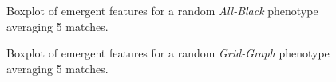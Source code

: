 \vspace*{\fill}
{
\centering
\begin{figure}[hbt!]
    \centering
    \caption{Boxplot of emergent features for a random \textit{All-Black} phenotype averaging 5 matches.}
    \label{fig:emergent_features_noisiness_5_ab}
\end{figure}
}
\vspace*{\fill}
\begin{figure}[p]
    \caption{Boxplot of emergent features for a random \textit{Grid-Graph} phenotype averaging 5 matches.}
    \label{fig:emergent_features_noisiness_5_grid}
\end{figure}

